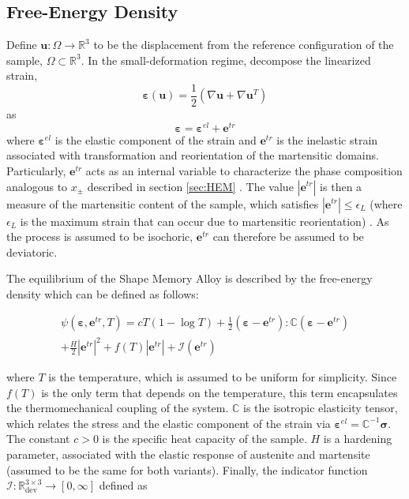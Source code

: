 \begin{multicols}{2}
\subsection{Free-Energy Density}\label{sec:FED}
Define $\mathbf{u}: \Omega \longrightarrow \mathbb{R}^3$ to be the displacement from the reference configuration of the sample, $\Omega \subset \mathbb{R}^3$. In the small-deformation regime, decompose the linearized strain,
\begin{equation} \label{eq:2}
    \bm{\varepsilon}(\mathbf{u}) = \frac{1}{2}(\nabla\mathbf{u} + \nabla\mathbf{u}^{T}) 
\end{equation}
as
\begin{equation} \label{eq:3}
    \bm{\varepsilon} = \bm{\varepsilon}^{el} + \mathbf{e}^{tr}
\end{equation}
 where $\bm{\varepsilon}^{el}$ is the elastic component of the strain and $\mathbf{e}^{tr}$ is the inelastic strain associated with transformation and reorientation of the martensitic domains. Particularly, $\mathbf{e}^{tr}$ acts as an internal variable to characterize the phase composition analogous to $x_\pm$ described in section \ref{sec:HEM} \cite{smith2005smart}. The value $|\mathbf{e}^{tr}|$ is then a measure of the martensitic content of the sample, which satisfies $|\mathbf{e}^{tr}| \leq \epsilon_L$ (where $\epsilon_L$ is the maximum strain that can occur due to martensitic reorientation) \cite{auricchio2016gradient}. As the process is assumed to be isochoric, $\mathbf{e}^{tr}$ can therefore be assumed to be deviatoric.

The equilibrium of the Shape Memory Alloy is described by the free-energy density which can be defined as follows:

\begin{multline}
\psi(\bm{\varepsilon}, \mathbf{e}^{tr}, T) = cT(1 - \log T) + \frac{1}{2}(\bm{\varepsilon} - \mathbf{e}^{tr}):\mathbb{C}(\bm{\varepsilon} - \mathbf{e}^{tr})\\
 + \frac{H}{2}|\mathbf{e}^{tr}|^{2} + f( T)|\mathbf{e}^{tr}| + \mathscr{I}(\mathbf{e}^{tr})\label{eq:freeenergy}
\end{multline}  

where $T$ is the temperature, which is assumed to be uniform for simplicity. Since $f( T)$ is the only term that depends on the temperature, this term encapsulates the thermomechanical coupling of the system. $\mathbb{C}$ is the isotropic elasticity tensor, which relates the stress and the elastic component of the strain via $\bm{\varepsilon}^{el} = \mathbb{C}^{-1}\bm{\sigma}$. The constant $c > 0$ is the specific heat capacity of the sample. $H$ is a hardening parameter, associated with the elastic response of austenite and martensite (assumed to be the same for both variants). Finally, the indicator function $\mathscr{I}:\mathbb{R}_{\mathrm{dev}}^{3\times3} \rightarrow [0,\infty]$ defined as


\end{multicols}
